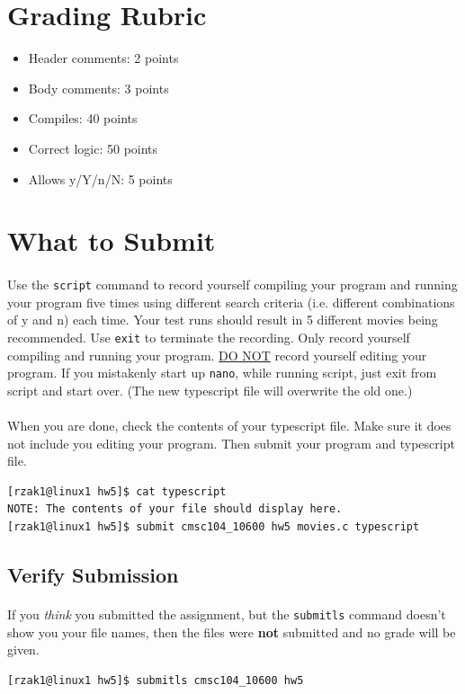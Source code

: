 \documentclass[letter,11pt]{article}
\begin{document}
\newpage
\section*{Grading Rubric}
\begin{itemize}
    \item Header comments: 2 points
    \item Body comments: 3 points
    \item Compiles: 40 points
    \item Correct logic: 50 points
    \item Allows y/Y/n/N: 5 points
\end{itemize}

\section*{What to Submit}
\paragraph{}Use the \texttt{script} command to record yourself compiling your program and running your program five times using different search criteria (i.e. different combinations of y and n) each time. Your test runs should result in 5 different movies being recommended. Use \texttt{exit} to terminate the recording. Only record yourself compiling and running your program. \underline{DO NOT} record yourself editing your program. If you mistakenly start up \texttt{nano}, while running script, just exit from script and start over. (The new typescript file will overwrite the old one.)

\paragraph{}When you are done, check the contents of your typescript file. Make sure it does not include you editing your program. Then submit your program and typescript file.
\begin{verbatim}
[rzak1@linux1 hw5]$ cat typescript
NOTE: The contents of your file should display here.
[rzak1@linux1 hw5]$ submit cmsc104_10600 hw5 movies.c typescript
\end{verbatim}

\subsection*{Verify Submission}
\paragraph{}If you \textit{think} you submitted the assignment, but the \texttt{submitls} command doesn't show you your file names, then the files were \textbf{not} submitted and no grade will be given.
\begin{verbatim}
[rzak1@linux1 hw5]$ submitls cmsc104_10600 hw5
\end{verbatim}
\end{document}
